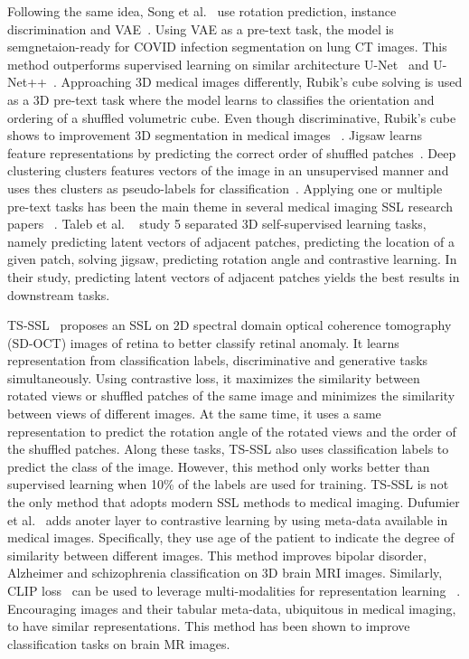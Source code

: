 \documentclass[a4paper,11pt,oneside]{report}
\begin{document}
 Following the same idea, Song et al.~\cite{Song2022} use rotation prediction, instance discrimination and VAE~\cite{Kingma2013}. Using VAE as a pre-text task, the model is semgnetaion-ready for COVID infection segmentation on lung CT images. This method outperforms supervised learning on similar architecture U-Net~\cite{Ronneberger2015} and U-Net++~\cite{Zhou2020}. Approaching 3D medical images differently, Rubik's cube solving is used as a 3D pre-text task where the model learns to classifies the orientation and ordering of a shuffled volumetric cube. Even though discriminative, Rubik's cube shows to improvement 3D segmentation in medical images ~\cite{Zhuang2019}. Jigsaw learns feature representations by predicting the correct order of shuffled patches~\cite{Noroozi2016}. Deep clustering clusters features vectors of the image in an unsupervised manner and uses thes clusters as pseudo-labels for classification~\cite{Caron2018}. Applying one or multiple pre-text tasks has been the main theme in several medical imaging SSL research papers ~\cite{Zhou2021, Zhang2021, Dufumier2021}. Taleb et al. ~\cite{Taleb2020} study 5 separated 3D self-supervised learning tasks, namely predicting latent vectors of adjacent patches, predicting the location of a given patch, solving jigsaw, predicting rotation angle and contrastive learning. In their study, predicting latent vectors of adjacent patches yields the best results in downstream tasks.

TS-SSL~\cite{Zhang2021} proposes an SSL on 2D spectral domain optical coherence tomography (SD-OCT) images of retina to better classify retinal anomaly. It learns representation from classification labels, discriminative and generative tasks simultaneously. Using contrastive loss, it maximizes the similarity between rotated views or shuffled patches of the same image and minimizes the similarity between views of different images. At the same time, it uses a same representation to predict the rotation angle of the rotated views and the order of the shuffled patches. Along these tasks, TS-SSL also uses classification labels to predict the class of the image. However, this method only works better than supervised learning when 10\% of the labels are used for training. TS-SSL is not the only method that adopts modern SSL methods to medical imaging. Dufumier et al.~\cite{Dufumier2021} adds anoter layer to contrastive learning by using meta-data available in medical images. Specifically, they use age of the patient to indicate the degree of similarity between different images. This method improves bipolar disorder, Alzheimer and schizophrenia classification on 3D brain MRI images. Similarly, CLIP loss~\cite{Radford2021CLIP} can be used to leverage multi-modalities for representation learning ~\cite{Hager2023}. Encouraging images and their tabular meta-data, ubiquitous in medical imaging, to have similar representations. This method has been shown to improve classification tasks on brain MR images. 
\end{document}
